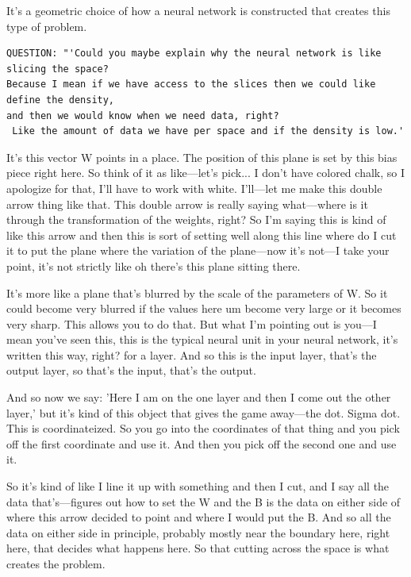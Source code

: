 It's a geometric choice of how a neural network is constructed that creates this type of problem.


\begin{verbatim}
QUESTION: "'Could you maybe explain why the neural network is like slicing the space? 
Because I mean if we have access to the slices then we could like define the density,
and then we would know when we need data, right?
 Like the amount of data we have per space and if the density is low.'
\end{verbatim}



It's this vector W points in a place. The position of this plane is set by this bias piece right here. So think of it as like—let's pick... I don't have colored chalk, so I apologize for that, I'll have to work with white. I'll—let me make this double arrow thing like that. This double arrow is really saying what—where is it through the transformation of the weights, right? So I'm saying this is kind of like this arrow and then this is sort of setting well along this line where do I cut it to put the plane where the variation of the plane—now it's not—I take your point, it's not strictly like oh there's this plane sitting there. 

It's more like a plane that's blurred by the scale of the parameters of W. So it could become very blurred if the values here um become very large or it becomes very sharp. This allows you to do that. But what I'm pointing out is you—I mean you've seen this, this is the typical neural unit in your neural network, it's written this way, right? for a layer. And so this is the input layer, that's the output layer, so that's the input, that's the output. 

And so now we say: 'Here I am on the one layer and then I come out the other layer,' but it's kind of this object that gives the game away—the dot. Sigma dot. This is coordinateized. So you go into the coordinates of that thing and you pick off the first coordinate and use it. And then you pick off the second one and use it. 

So it's kind of like I line it up with something and then I cut, and I say all the data that's—figures out how to set the W and the B is the data on either side of where this arrow decided to point and where I would put the B. And so all the data on either side in principle, probably mostly near the boundary here, right here, that decides what happens here. So that cutting across the space is what creates the problem. 

